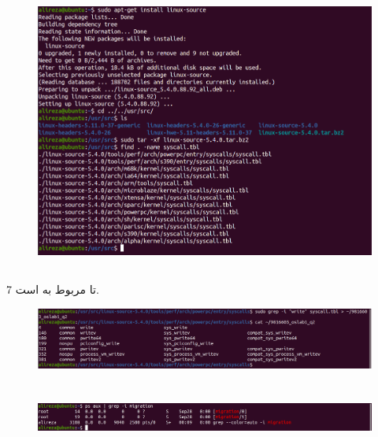 \documentclass{article}
\begin{document}
\section{}

\section{}
\begin{figure}[ht]
    \centering
    \includegraphics[width=1.0\textwidth]{figures/a.png}
    \caption{}
    \label{fig:fig1}
\end{figure}
\FloatBarrier

\subsection{}
7 تا مربوط به
است.
\begin{figure}[ht]
    \centering
    \includegraphics[width=1.0\textwidth]{figures/b.png}
    \caption{}
    \label{fig:fig1}
\end{figure}
\FloatBarrier

\section{}
\begin{figure}[ht]
    \centering
    \includegraphics[width=1.0\textwidth]{figures/5.png}
    \caption{}
    \label{fig:fig1}
\end{figure}
\FloatBarrier
\end{document}
